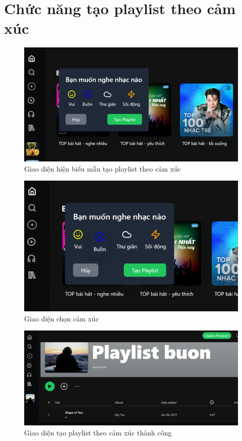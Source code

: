 \section{Chức năng tạo playlist theo cảm xúc}

\begin{figure}[H]
    \centering
    \includegraphics[width=1\textwidth]{imgs/chap5/playlist1.png}
    \caption{Giao diện hiện biểu mẫu tạo playlist theo cảm xúc}
\end{figure}

\begin{figure}[H]
    \centering
    \includegraphics[width=1\textwidth]{imgs/chap5/playlist2.png}
    \caption{Giao diện chọn cảm xúc}
\end{figure}

\begin{figure}[H]
    \centering
    \includegraphics[width=1\textwidth]{imgs/chap5/playlist3.png}
    \caption{Giao diện tạo playlist theo cảm xúc thành công}
\end{figure}




